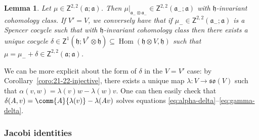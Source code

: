 \documentclass[10pt,a4paper]{amsart}
\numberwithin{equation}{section}
\newtheorem{Lemma}[Theorem]{Lemma}
\newcommand{\fa}{\mathfrak{a}}
\newcommand{\fh}{\mathfrak{h}}
\newcommand{\fso}{\mathfrak{so}}
\newcommand{\ssZ}{\mathsf{Z}}
\newcommand{\1}{\mathbbm{1}}
\DeclareMathOperator{\Hom}{Hom}
\begin{document}
\begin{Lemma}\label{lemma:invt-spencer-cocycle}
	Let $\mu\in\ssZ^{2,2}(\fa;\fa)$. Then $\mu|_{\fa_-\otimes\fa_-}\in\ssZ^{2,2}(\fa_-;\fa)$ with $\fh$-invariant cohomology class. If $V'=V$, we conversely have that if $\mu_-\in\ssZ^{2,2}(\fa_-;\fa)$ is a Spencer cocycle such that with $\fh$-invariant cohomology class then there exists a unique cocycle $\delta\in\ssZ^1(\fh;V^*\otimes\fh)\subseteq\Hom(\fh\otimes V,\fh)$ such that $\mu=\mu_-+\delta\in\ssZ^{2,2}(\fa;\fa)$.
\end{Lemma}

We can be more explicit about the form of $\delta$ in the $V=V'$ case: by Corollary~\ref{coro:21-22-injective}, there exists a unique map $\lambda\colon V\to\fso(V)$ such that
$\alpha(v,w) = \lambda(v)w - \lambda(w)v$.
One can then easily check that
$\delta(A,v) = \comm{A}{\lambda(v)} - \lambda(Av)
$
solves equations \eqref{eq:alpha-delta}--\eqref{eq:gamma-delta}.

\subsubsection{Jacobi identities}
\end{document}
